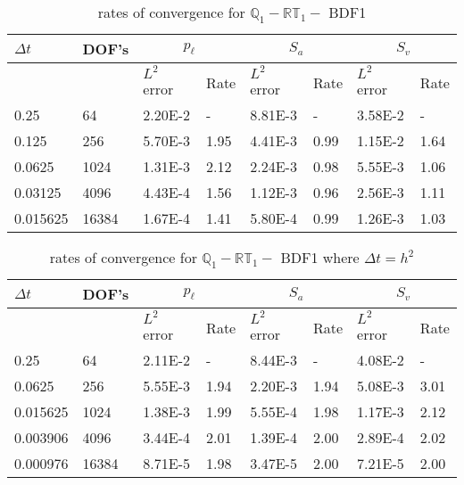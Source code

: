 \begin{table}[ht]
	\centering
	\begin{tabular}{|l|l|l||l|l||l|l|l|}
		\hline
		$\Delta t$ & DOF's & \multicolumn{2}{c|}{$p_{\ell}$} & \multicolumn{2}{c|}{$S_a$} & \multicolumn{2}{c|}{$S_v$}  \\ \hline
		& & $L^2$ error & Rate & $L^2$ error & Rate & $L^2$ error & Rate \\ \hline
		0.25   	& 64    & 2.20E-2 & -	 & 8.81E-3 & -    & 3.58E-2 & - \\ \hline
		0.125   & 256   & 5.70E-3 & 1.95 & 4.41E-3 & 0.99 & 1.15E-2 & 1.64 \\ \hline
		0.0625  & 1024  & 1.31E-3 & 2.12 & 2.24E-3 & 0.98 & 5.55E-3 & 1.06 \\ \hline
		0.03125 & 4096  & 4.43E-4 & 1.56 & 1.12E-3 & 0.96 & 2.56E-3 & 1.11 \\ \hline 
		0.015625& 16384 & 1.67E-4 & 1.41 & 5.80E-4 & 0.99 & 1.26E-3 & 1.03  \\ \hline
	\end{tabular}
	\caption[Template table-description for list of tables.]{ rates of convergence for $\mathbb{Q}_1 - \mathbb{RT}_1 -$ BDF1 } \label{table:template1}
\end{table}


\begin{table}[ht]
	\centering
	\begin{tabular}{|l|l|l||l|l||l|l|l|}
		\hline
		$\Delta t$ & DOF's & \multicolumn{2}{c|}{$p_{\ell}$} & \multicolumn{2}{c|}{$S_a$} & \multicolumn{2}{c|}{$S_v$}  \\ \hline
		& & $L^2$ error & Rate & $L^2$ error & Rate & $L^2$ error & Rate \\ \hline
		0.25   	  & 64    & 2.11E-2 & -	   & 8.44E-3 & -    & 4.08E-2 & - \\ \hline
		0.0625    & 256   & 5.55E-3 & 1.94 & 2.20E-3 & 1.94 & 5.08E-3 & 3.01 \\ \hline
		0.015625  & 1024  & 1.38E-3 & 1.99 & 5.55E-4 & 1.98 & 1.17E-3 & 2.12 \\ \hline
		0.003906  & 4096  & 3.44E-4 & 2.01 & 1.39E-4 & 2.00 & 2.89E-4 & 2.02 \\ \hline 
		0.000976  & 16384 & 8.71E-5 & 1.98 & 3.47E-5 & 2.00 & 7.21E-5 & 2.00  \\ \hline
	\end{tabular}
	\caption[Template table-description for list of tables.]{ rates of convergence for $\mathbb{Q}_1 - \mathbb{RT}_1 -$ BDF1 where $\Delta t = h^2$} \label{table:template}
\end{table}


